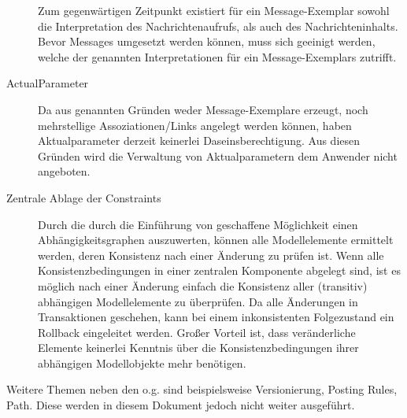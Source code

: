 \begin{description}
  	Zum gegenwärtigen Zeitpunkt existiert für ein Message-Exemplar sowohl die Interpretation des Nachrichtenaufrufs, als auch des Nachrichteninhalts.
	Bevor Messages umgesetzt werden können, muss sich geeinigt werden, welche der genannten Interpretationen für ein Message-Exemplars zutrifft. 
  \item[ActualParameter] Da aus genannten Gründen weder Message-Exemplare erzeugt, noch mehrstellige Assoziationen/Links angelegt werden können, 
  	haben Aktualparameter derzeit keinerlei Daseinsberechtigung. Aus diesen Gründen wird die Verwaltung von Aktualparametern dem Anwender nicht angeboten.
  \item[Zentrale Ablage der Constraints] Durch die durch die Einführung von  geschaffene Möglichkeit einen Abhängigkeitsgraphen 
	auszuwerten, können alle Modellelemente ermittelt werden, deren Konsistenz nach einer Änderung zu prüfen ist. Wenn alle Konsistenzbedingungen 
	in einer zentralen Komponente abgelegt sind, ist es möglich nach einer Änderung einfach die Konsistenz aller (transitiv) abhängigen Modellelemente zu überprüfen. 
	Da alle Änderungen in Transaktionen geschehen, kann bei einem inkonsistenten Folgezustand ein Rollback eingeleitet werden.
	Großer Vorteil ist, dass veränderliche Elemente keinerlei Kenntnis über die Konsistenzbedingungen ihrer abhängigen Modellobjekte mehr benötigen.
\end{description}

Weitere Themen neben den o.g. sind beispielsweise Versionierung, Posting Rules, Path. Diese werden in diesem Dokument jedoch nicht weiter ausgeführt.